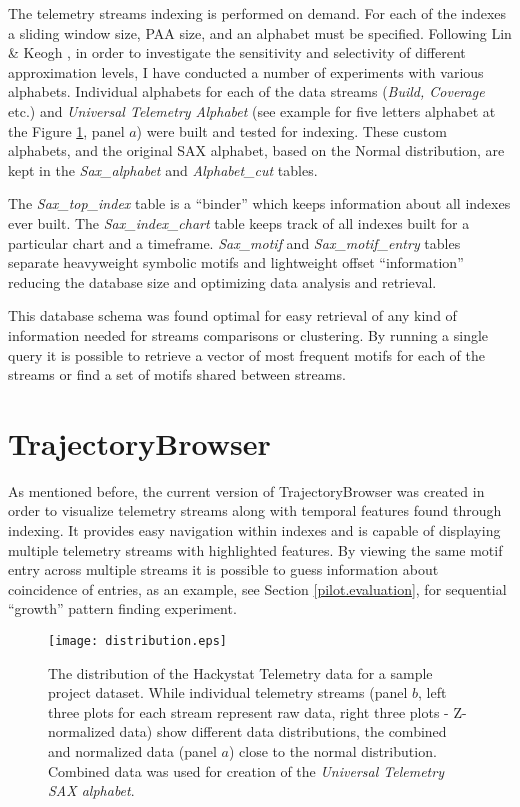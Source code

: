The telemetry streams indexing is performed on demand. For each of the indexes a sliding window size, PAA size, and an alphabet must be specified. Following Lin \& Keogh \cite{citeulike:2821475}, in order to investigate the sensitivity and selectivity of different approximation levels, I have conducted a number of experiments with various alphabets. Individual alphabets for each of the data streams (\textit{Build, Coverage} etc.) and \textit{Universal Telemetry Alphabet} (see example for five letters alphabet at the Figure \ref{fig:distribution}, panel $a$) were built and tested for indexing. These custom alphabets, and the original SAX alphabet, based on the Normal distribution, are kept in the \textit{Sax\_alphabet} and \textit{Alphabet\_cut} tables. 

The \textit{Sax\_top\_index} table is a ``binder'' which keeps information about all indexes ever built. The \textit{Sax\_index\_chart} table keeps track of all indexes built for a particular chart and a timeframe. \textit{Sax\_motif} and \textit{Sax\_motif\_entry} tables separate heavyweight symbolic motifs and lightweight offset ``information'' reducing the database size and optimizing data analysis and retrieval. 

This database schema was found optimal for easy retrieval of any kind of information needed for streams comparisons or clustering. By running a single query it is possible to retrieve a vector of most frequent motifs for each of the streams or find a set of motifs shared between streams.

\section{TrajectoryBrowser}
As mentioned before, the current version of TrajectoryBrowser was created in order to visualize telemetry streams along with temporal features found through indexing. It provides easy navigation within indexes and is capable of displaying multiple telemetry streams with highlighted features. By viewing the same motif entry across multiple streams it is possible to guess information about coincidence of entries, as an example, see Section \ref{pilot.evaluation}, for sequential ``growth'' pattern finding experiment.

\begin{figure}[tbp]
   \centering
   \texttt{[image: distribution.eps]}
   \caption{The distribution of the Hackystat Telemetry data for a sample project dataset. While individual telemetry streams (panel $b$, left three plots for each stream represent raw data, right three plots - Z-normalized data) show different data distributions, the combined and normalized data (panel $a$) close to the normal distribution. Combined data was used for creation of the \textit{Universal Telemetry SAX alphabet}.}
   \label{fig:distribution}
\end{figure}

